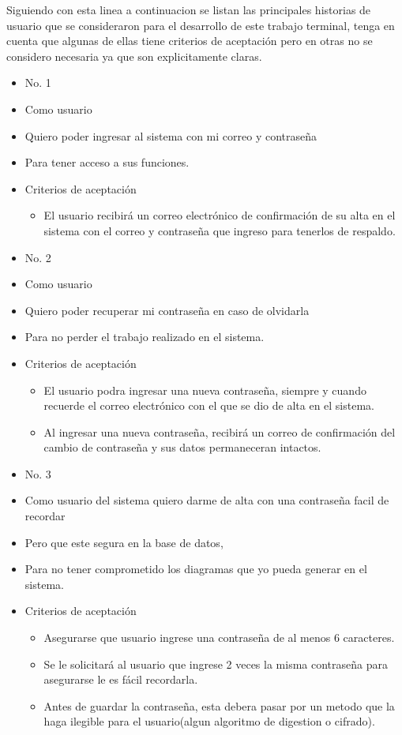Siguiendo con esta linea a continuacion se listan las principales historias de usuario que se consideraron para el desarrollo de este trabajo terminal,
tenga en cuenta que algunas de ellas tiene criterios de aceptación pero en otras no se considero necesaria ya que son explicitamente claras.\\
\hline
\begin{itemize}
	\item No. 1
	\item Como usuario
	\item Quiero poder ingresar al sistema con mi correo y contraseña
	\item Para tener acceso a sus funciones.
	\item Criterios de aceptación
	\begin{itemize}
		\item El usuario recibirá un correo electrónico de confirmación de su alta en el sistema con el correo y contraseña que ingreso para tenerlos de respaldo.
	\end{itemize}
\end{itemize}
\hline
\begin{itemize}
	\item No. 2
	\item Como usuario
	\item Quiero poder recuperar mi contraseña en caso de olvidarla
	\item Para no perder el trabajo realizado en el sistema.
	\item Criterios de aceptación
	\begin{itemize}
		\item El usuario podra ingresar una nueva contraseña, siempre y cuando recuerde el correo electrónico con el que se dio de alta en el sistema.
		\item Al ingresar una nueva contraseña, recibirá un correo de confirmación del cambio de contraseña y sus datos permaneceran intactos.
	\end{itemize}
\end{itemize}
\hline
\begin{itemize}
	\item No. 3
	\item Como usuario del sistema quiero darme de alta con una contraseña facil de recordar
	\item Pero que este segura en la base de datos,
	\item Para no tener comprometido los diagramas que yo pueda generar en el sistema.

	\item Criterios de aceptación
	\begin{itemize}
		\item Asegurarse que usuario ingrese una contraseña de al menos 6 caracteres.
		\item Se le solicitará al usuario que ingrese 2 veces la misma contraseña para asegurarse le es fácil recordarla.
		\item Antes de guardar la contraseña, esta debera pasar por un metodo que la haga ilegible para el usuario(algun algoritmo de digestion o cifrado).
	\end{itemize}
\end{itemize}
